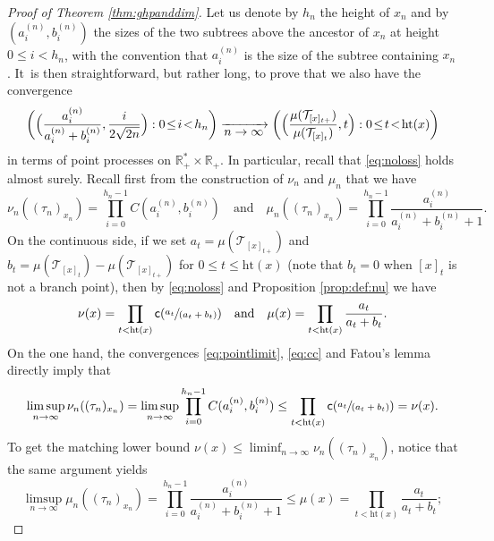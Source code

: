 \documentclass[11pt]{article}
\newcommand{\spfrac}[2]{\sfrac{#1}{(#2)}}
\newcommand{\T}{\mathcal{T}}\let\CRT\T\let\tbr\T
\theoremstyle{definition}
\begin{document}
\begin{proof}[Proof of Theorem \ref{thm:ghpanddim}]
Let us denote by $h_n$ the height of $x_n$ and by $(a^{(n)}_i,b^{(n)}_i)$ the sizes of the two subtrees above the ancestor of $x_n$ at height $0\leq i < h_n$, with the convention that $a^{(n)}_i$ is the size of the subtree containing $x_n$. It~is then straightforward, but rather long, to prove that we also have the convergence\vspace*{-3pt}\enlargethispage{\baselineskip}
\begin{equation} \label{eq:pointlimit} \biggl(\Bigl(\frac{a_i^{(n)}}{a_i^{(n)}+b_i^{(n)}} , \frac{i}{ 2\sqrt{2n}} \Bigr) : 0 \!\leq\! i \!<\! h_n \biggr) \xrightarrow[\textstyle n \to \infty]{}\biggl(\Bigl(\frac{\mu(\T_{[x]_{t+}})}{\mu(\T_{[x]_{t}})},t \Bigr) : 0 \!\leq\! t\! <\! \mathrm{ht}(x) \biggr)
\end{equation}
in terms of point processes on $ \mathbb{R}_+^* \times \mathbb{R}_+$. In particular, recall that \eqref{eq:noloss} holds almost surely.
Recall first from the construction of $\nu_n$ and $\mu_n$ that we have\vspace*{-3pt}
\begin{equation} \label{rappelnun} \nu_n((\tau_n)_{x_n}) = \prod_{i=0}^{h_n-1} C(a_i^{(n)}, b_i^{(n)}) \quad \text{and} \quad \mu_n((\tau_n)_{x_n}) = \prod_{i=0}^{h_n-1} \frac{a_i^{(n)}}{a_i^{(n)}+b_i^{(n)}+1}.
\end{equation}
On the continuous side, if we set $a_t = \mu(\T_{[x]_{t+}})$ and $b_t = \mu(\T_{[x]_{t}})-\mu(\T_{[x]_{t+}})$ for $0 \leq t \leq \mathrm{ht}(x)$ (note that $b_t=0$ when $[x]_t$ is not a branch point), then by \eqref{eq:noloss} and Proposition \ref{prop:def:nu} we have\vspace*{-3pt}
\begin{equation} \label{rappelnu}\nu(x) = \prod_{t < \mathrm{ht}(x)} \mathsf{c}(\spfrac{a_t}{a_t+b_t}) \quad \text{and} \quad \mu(x) = \prod_{t < \mathrm{ht}(x)} \frac{a_t}{a_t+b_t}.
\end{equation}
On the one hand, the convergences \eqref{eq:pointlimit}, \eqref{eq:cc} and Fatou's lemma directly imply that\vspace*{-3pt}
\[
\limsup_{n \to \infty} \nu_n((\tau_n)_{x_n}) = \limsup_{n \to \infty}\prod_{i=0}^{h_n-1} C(a_i^{(n)}, b_i^{(n)}) \leq \prod_{t < \mathrm{ht}(x)} \mathsf{c}(\spfrac{a_t}{a_t+b_t}) =\nu(x).
\]
To get the matching lower bound $\nu(x)\leq \liminf_{n \to \infty} \nu_n((\tau_n)_{x_n})$, notice that the same argument yields\vspace*{-3pt}
\[
\limsup_{n \to \infty} \mu_n((\tau_n)_{x_n}) = \prod_{i=0}^{h_n-1} \frac{a_i^{(n)}}{a_i^{(n)}+b_i^{(n)}+1} \leq \mu(x) = \prod_{t < \mathrm{ht}(x)} \frac{a_t}{a_t+b_t};
\]
\end{proof}
\end{document}
